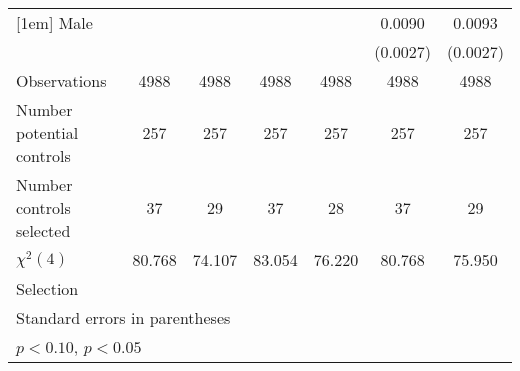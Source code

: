 {\begin{tabular}{l*{6}{c}}
[1em]
\hspace{3mm}Male    &                    &                    &                    &                    &      0.0090\sym{**}&      0.0093\sym{**}\\
                    &                    &                    &                    &                    &    (0.0027)        &    (0.0027)        \\
\hline
Observations        &        4988        &        4988        &        4988        &        4988        &        4988        &        4988        \\
Number potential controls&         257        &         257        &         257        &         257        &         257        &         257        \\
Number controls selected&          37        &          29        &          37        &          28        &          37        &          29        \\
$\chi^2(4)$         &      80.768        &      74.107        &      83.054        &      76.220        &      80.768        &      75.950        \\
Selection           &                    &                    &                    &                    &                    &                    \\
\hline\hline
\multicolumn{7}{l}{\footnotesize Standard errors in parentheses}\\
\multicolumn{7}{l}{\footnotesize \sym{*} \(p<0.10\), \sym{**} \(p<0.05\)}\\
\end{tabular}
}
